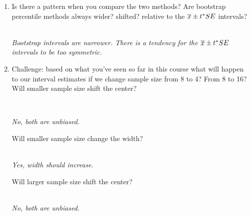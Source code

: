 \begin{enumerate}
\begin{enumerate}
\item a 99\% CI for $\mu$ is (show work)
\begin{students}
        \vspace{1cm}        
\end{students}
\begin{key}
 {\it AWV, $24.125 \pm  3.50 \times 5.31 = ( 5.5, 42.7)$\\
     Bootstrap: (11.3, 36.9)}
\end{key}
\end{enumerate}
\item Is there a pattern when you compare the two methods?  Are
  bootstrap percentile methods always wider? shifted? relative to the 
 $\overline{x} \pm t^* SE$ intervals?
\begin{students}
        \vspace{3cm}        
\end{students}
\begin{key}
  \\ {\it Bootstrap intervals are narrower.  There is a tendency for
    the $\overline{x} \pm t^* SE$ intervals to be   too symmetric. }
\end{key}

\item Challenge: based on what you've seen so far in this course what
  will happen to our interval estimates if we 
  change  sample size from 8 to  4?  From 8 to 16?\\
   Will smaller sample size shift the center?
\begin{students}
        \vspace{.5cm}        \\
\end{students}
\begin{key}
{\it No, both are unbiased.}
\end{key}

Will smaller sample size change the width?
\begin{students}
        \vspace{.5cm}        
\end{students}
\begin{key}
\\{\it Yes, width should increase.}
\end{key}

   Will larger sample size shift the center?
\begin{students}
        \vspace{.5cm}        
\end{students}
\begin{key}
\\{\it No, both are unbiased.}
\end{key}


\end{enumerate}
